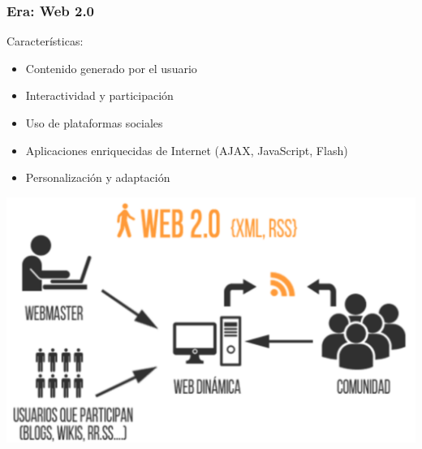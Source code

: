 \documentclass[
10pt, %
aspectratio=169, %
]{beamer}
\begin{document}
	\begin{frame}
		
		\frametitle{Era: Web 2.0}
		
		Características:
		\begin{itemize}
			
			\item Contenido generado por el usuario
			
			\item Interactividad y participación
			
			\item Uso de plataformas sociales
			
			\item Aplicaciones enriquecidas de Internet (AJAX, JavaScript, Flash)
			
			\item Personalización y adaptación
			
		\end{itemize}
		
		\centering
		\includegraphics[scale=0.37]{web2_0.png} 
		

\end{frame}
\end{document}
